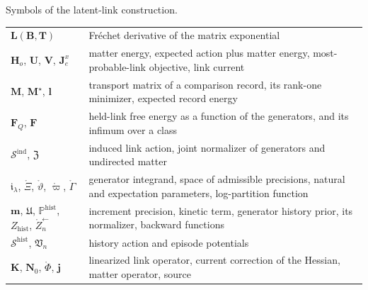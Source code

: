 \begin{sciencetable}{Symbols of the latent-link construction.}
\begin{tabularx}{\textwidth}{>{\raggedright\arraybackslash}p{}>{\raggedright\arraybackslash}X}
\(\mathbf L(\mathbf B,\mathbf T)\) & Fr\'echet derivative of the matrix exponential \\
\(\mathbf H_o\), \(\mathbf U\), \(\mathbf V\), \(\mathbf J^x_e\) & matter energy, expected action plus matter energy, most-probable-link objective, link current \\
\(\mathbf M\), \(\mathbf M^\star\), \(\mathbf l\) & transport matrix of a comparison record, its rank-one minimizer, expected record energy \\
\(\mathbf F_Q\), \(\mathbf F\) & held-link free energy as a function of the generators, and its infimum over a class \\
\(\mathscr S^{\mathrm{ind}}\), \(\mathfrak Z\) & induced link action, joint normalizer of generators and undirected matter \\
\(\mathfrak i_\lambda\), \(\mathring\Xi\), \(\mathring\vartheta\), \(\mathring\varpi\), \(\mathring\Gamma\) & generator integrand, space of admissible precisions, natural and expectation parameters, log-partition function \\
\(\mathbf m\), \(\mathfrak U\), \(\mathbb P^{\mathrm{hist}}\), \(Z_{\mathrm{hist}}\), \(\mathring Z^{\leftarrow}_n\) & increment precision, kinetic term, generator history prior, its normalizer, backward functions \\
\(\mathscr S^{\mathrm{hist}}\), \(\mathfrak V_n\) & history action and episode potentials \\
\(\mathbf K\), \(\mathbf N_0\), \(\mathring\Phi\), \(\mathbf j\) & linearized link operator, current correction of the Hessian, matter operator, source \\
\bottomrule
\end{tabularx}
\end{sciencetable}

